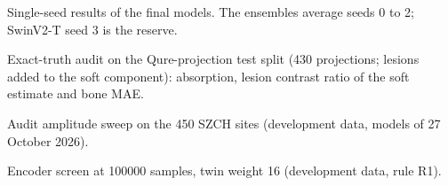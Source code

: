 \begin{table}[htbp]
\centering\small
\caption{Single-seed results of the final models. The ensembles average seeds 0 to 2; SwinV2-T seed 3 is the reserve.}
\label{tab:app_seeds}
\end{table}
\begin{table}[htbp]
\centering\small
\caption{Exact-truth audit on the Qure-projection test split (430 projections; lesions added to the soft component): absorption, lesion contrast ratio of the soft estimate and bone MAE.}
\label{tab:app_qp}
\end{table}
\begin{table}[htbp]
\centering\small
\caption{Audit amplitude sweep on the 450 SZCH sites (development data, models of 27 October 2026).}
\label{tab:app_amplitude}
\end{table}
\begin{table}[htbp]
\centering\small
\caption{Encoder screen at \num{100000} samples, twin weight 16 (development data, rule R1).}
\label{tab:app_screen}
\end{table}
